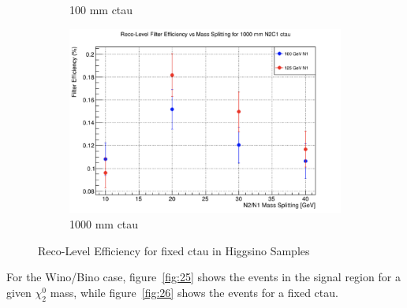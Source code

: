\documentclass{article}
\begin{document}
\begin{figure} [H]
\begin{subfigure}{.5\textwidth}
  \caption{100 mm ctau}
  \label{fig:sub-third18}
\end{subfigure}
\begin{subfigure}{.5\textwidth}
  \centering
  \includegraphics[width=.8\linewidth]{1000mmEff.png}  
  \caption{1000 mm ctau}
  \label{fig:sub-fourth18}
\end{subfigure}
\caption{Reco-Level Efficiency for fixed ctau in Higgsino Samples}
\label{fig:24}
\end{figure}
\par
For the Wino/Bino case, figure~\ref{fig:25} shows the events in the signal region for a given $\chi_{2}^{0}$ mass, while figure~\ref{fig:26} shows the events for a fixed ctau.
\par
\end{document}
